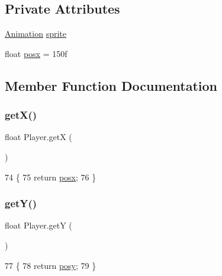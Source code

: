 \subsection*{Private Attributes}
\begin{DoxyCompactItemize}
\item 
\mbox{\hyperlink{classorg_1_1newdawn_1_1slick_1_1_animation}{Animation}} \mbox{\hyperlink{class_player_a500d31b34518044f505159570d00a774}{sprite}}
\item 
float \mbox{\hyperlink{class_player_a8c2978dfd4bab9a91bf1793b0edbe698}{posx}} = 150f
\end{DoxyCompactItemize}


\subsection{Member Function Documentation}
\mbox{\label{class_player_aca68294689ea1609fbf58eb7e2a6850f}} 
\subsubsection{\texorpdfstring{get\+X()}{getX()}}
{\footnotesize\ttfamily float Player.\+getX (\begin{DoxyParamCaption}{ }\end{DoxyParamCaption})\hspace{0.3cm}{\ttfamily [inline]}}


\begin{DoxyCode}
74                        \{
75         \textcolor{keywordflow}{return} \mbox{\hyperlink{class_player_a8c2978dfd4bab9a91bf1793b0edbe698}{posx}};
76     \}
\end{DoxyCode}
\mbox{\label{class_player_a39e72ac5911ce17465168e64995e07d9}} 
\subsubsection{\texorpdfstring{get\+Y()}{getY()}}
{\footnotesize\ttfamily float Player.\+getY (\begin{DoxyParamCaption}{ }\end{DoxyParamCaption})\hspace{0.3cm}{\ttfamily [inline]}}


\begin{DoxyCode}
77                        \{
78         \textcolor{keywordflow}{return} \mbox{\hyperlink{class_player_afc459a9ddc8482a3905bf40e410084a8}{posy}};
79     \}
\end{DoxyCode}
\mbox{\label{class_player_a58d8bd636240e41ec1db97774547e1c2}} 
